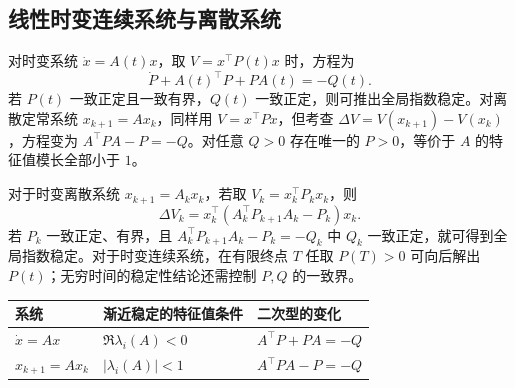 
\subsection{线性时变连续系统与离散系统}

对时变系统 $\dot x=A(t)x$，取 $V=x^\top P(t)x$ 时，方程为
\[
    \dot P+A(t)^\top P+PA(t)=-Q(t).
\]
若 $P(t)$ 一致正定且一致有界，$Q(t)$ 一致正定，则可推出全局指数稳定。对离散定常系统 $x_{k+1}=Ax_k$，同样用 $V=x^\top Px$，但考查 $\Delta V=V(x_{k+1})-V(x_k)$，方程变为 $A^\top PA-P=-Q$。对任意 $Q>0$ 存在唯一的 $P>0$，等价于 $A$ 的特征值模长全部小于 $1$。

对于时变离散系统 $x_{k+1}=A_kx_k$，若取 $V_k=x_k^\top P_kx_k$，则
\[
    \Delta V_k=x_k^\top(A_k^\top P_{k+1}A_k-P_k)x_k .
\]
若 $P_k$ 一致正定、有界，且 $A_k^\top P_{k+1}A_k-P_k=-Q_k$ 中 $Q_k$ 一致正定，就可得到全局指数稳定。对于时变连续系统，在有限终点 $T$ 任取 $P(T)>0$ 可向后解出 $P(t)$；无穷时间的稳定性结论还需控制 $P,Q$ 的一致界。

\begin{center}
\renewcommand{\arraystretch}{1.28}
\begin{tabular}{@{}lll@{}}
\toprule
系统 & 渐近稳定的特征值条件 & 二次型的变化\\
\midrule
$\dot x=Ax$ & $\Re\lambda_i(A)<0$ & $A^\top P+PA=-Q$\\
$x_{k+1}=Ax_k$ & $|\lambda_i(A)|<1$ & $A^\top PA-P=-Q$\\
\bottomrule
\end{tabular}
\end{center}


